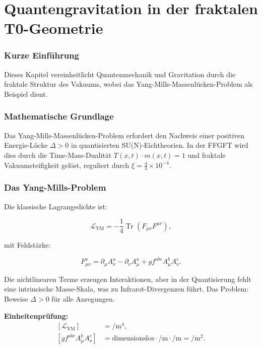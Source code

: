 \chapter{Quantengravitation in der fraktalen T0-Geometrie}


	
	\subsection*{Kurze Einführung}
	
	Dieses Kapitel vereinheitlicht Quantenmechanik und Gravitation durch die fraktale Struktur des Vakuums, wobei das Yang-Mills-Massenlücken-Problem als Beispiel dient.
	
	\subsection*{Mathematische Grundlage}
	
	Das Yang-Mills-Massenlücken-Problem erfordert den Nachweis einer positiven Energie-Lücke \(\Delta > 0\) in quantisierten SU(N)-Eichtheorien. In der FFGFT wird dies durch die Time-Mass-Dualität \(T(x,t) \cdot m(x,t) = 1\) und fraktale Vakuumsteifigkeit gelöst, reguliert durch \(\xi = \frac{4}{3} \times 10^{-4}\).

	
	\subsection*{Das Yang-Mills-Problem}
	
	Die klassische Lagrangedichte ist:
	
	\begin{equation}
		\mathcal{L}_{\text{YM}} = -\frac{1}{4} \operatorname{Tr} (F_{\mu\nu} F^{\mu\nu}),
	\end{equation}
	
	mit Feldstärke:
	
	\begin{equation}
		F_{\mu\nu}^a = \partial_\mu A_\nu^a - \partial_\nu A_\mu^a + g f^{abc} A_\mu^b A_\nu^c.
	\end{equation}
	
	Die nichtlinearen Terme erzeugen Interaktionen, aber in der Quantisierung fehlt eine intrinsische Masse-Skala, was zu Infrarot-Divergenzen führt. Das Problem: Beweise \(\Delta > 0\) für alle Anregungen.
	
	\textbf{Einheitenprüfung:}
	\[
	\begin{aligned}
		[\mathcal{L}_{\text{YM}}] &= \si{\per\meter^4}, \\
		[g f^{abc} A_\mu^b A_\nu^c] &= \text{dimensionslos} \cdot \si{\per\meter} \cdot \si{\per\meter} = \si{\per\meter^2}.
	\end{aligned}
	\]
	
